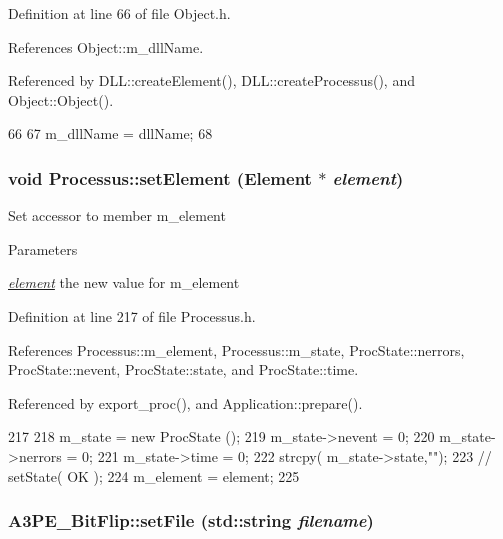Definition at line 66 of file Object.h.

References Object::m\_\-dllName.

Referenced by DLL::createElement(), DLL::createProcessus(), and Object::Object().


\begin{DoxyCode}
66                                       {
67     m_dllName = dllName;
68   }
\end{DoxyCode}
\hypertarget{classProcessus_a8ddef94227d83d9dae2cd49aebc33353}{
\subsubsection[{setElement}]{\setlength{\rightskip}{0pt plus 5cm}void Processus::setElement ({\bf Element} $\ast$ {\em element})}}
\label{classProcessus_a8ddef94227d83d9dae2cd49aebc33353}
Set accessor to member m\_\-element 
\begin{DoxyParams}{Parameters}
\item[{\em \hyperlink{namespaceelement}{element}}]the new value for m\_\-element \end{DoxyParams}


Definition at line 217 of file Processus.h.

References Processus::m\_\-element, Processus::m\_\-state, ProcState::nerrors, ProcState::nevent, ProcState::state, and ProcState::time.

Referenced by export\_\-proc(), and Application::prepare().


\begin{DoxyCode}
217                                      {
218     m_state = new ProcState ();
219     m_state->nevent  = 0;
220     m_state->nerrors = 0;
221     m_state->time    = 0;
222     strcpy( m_state->state,"");
223     //  setState( OK );
224     m_element = element;
225   }
\end{DoxyCode}
\hypertarget{classA3PE__BitFlip_a079d34acd89f699395a9bbf6b4918205}{
\subsubsection[{setFile}]{ A3PE\_\-BitFlip::setFile (std::string {\em filename})}}
\label{classA3PE__BitFlip_a079d34acd89f699395a9bbf6b4918205}


